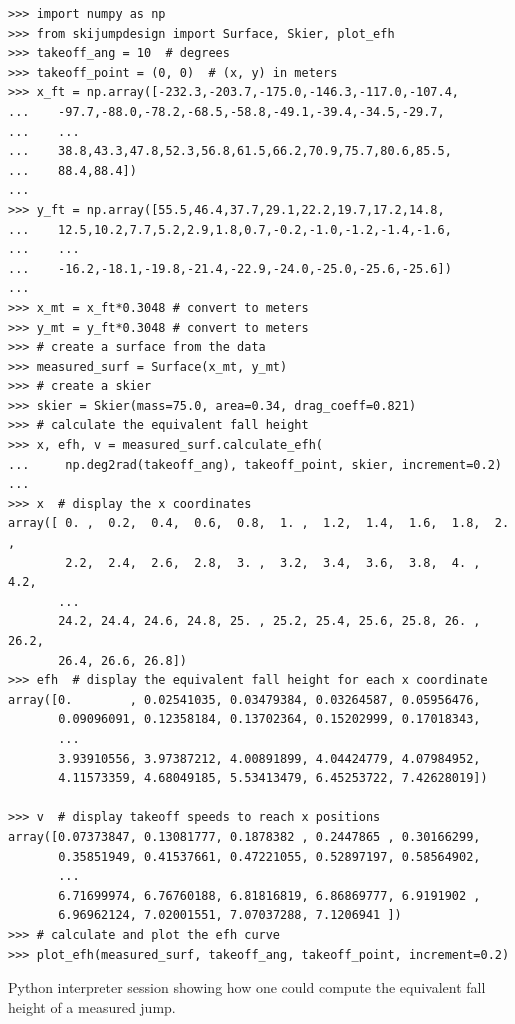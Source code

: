 \documentclass[smallextended]{svjour3}       %
\begin{document}
\begin{listing*}
  \begin{verbatim}
>>> import numpy as np
>>> from skijumpdesign import Surface, Skier, plot_efh
>>> takeoff_ang = 10  # degrees
>>> takeoff_point = (0, 0)  # (x, y) in meters
>>> x_ft = np.array([-232.3,-203.7,-175.0,-146.3,-117.0,-107.4,
...    -97.7,-88.0,-78.2,-68.5,-58.8,-49.1,-39.4,-34.5,-29.7,
...    ...
...    38.8,43.3,47.8,52.3,56.8,61.5,66.2,70.9,75.7,80.6,85.5,
...    88.4,88.4])
...
>>> y_ft = np.array([55.5,46.4,37.7,29.1,22.2,19.7,17.2,14.8,
...    12.5,10.2,7.7,5.2,2.9,1.8,0.7,-0.2,-1.0,-1.2,-1.4,-1.6,
...    ...
...    -16.2,-18.1,-19.8,-21.4,-22.9,-24.0,-25.0,-25.6,-25.6])
...
>>> x_mt = x_ft*0.3048 # convert to meters
>>> y_mt = y_ft*0.3048 # convert to meters
>>> # create a surface from the data
>>> measured_surf = Surface(x_mt, y_mt)
>>> # create a skier
>>> skier = Skier(mass=75.0, area=0.34, drag_coeff=0.821)
>>> # calculate the equivalent fall height
>>> x, efh, v = measured_surf.calculate_efh(
...     np.deg2rad(takeoff_ang), takeoff_point, skier, increment=0.2)
...
>>> x  # display the x coordinates
array([ 0. ,  0.2,  0.4,  0.6,  0.8,  1. ,  1.2,  1.4,  1.6,  1.8,  2. ,
        2.2,  2.4,  2.6,  2.8,  3. ,  3.2,  3.4,  3.6,  3.8,  4. ,  4.2,
       ...
       24.2, 24.4, 24.6, 24.8, 25. , 25.2, 25.4, 25.6, 25.8, 26. , 26.2,
       26.4, 26.6, 26.8])
>>> efh  # display the equivalent fall height for each x coordinate
array([0.        , 0.02541035, 0.03479384, 0.03264587, 0.05956476,
       0.09096091, 0.12358184, 0.13702364, 0.15202999, 0.17018343,
       ...
       3.93910556, 3.97387212, 4.00891899, 4.04424779, 4.07984952,
       4.11573359, 4.68049185, 5.53413479, 6.45253722, 7.42628019])

>>> v  # display takeoff speeds to reach x positions
array([0.07373847, 0.13081777, 0.1878382 , 0.2447865 , 0.30166299,
       0.35851949, 0.41537661, 0.47221055, 0.52897197, 0.58564902,
       ...
       6.71699974, 6.76760188, 6.81816819, 6.86869777, 6.9191902 ,
       6.96962124, 7.02001551, 7.07037288, 7.1206941 ])
>>> # calculate and plot the efh curve
>>> plot_efh(measured_surf, takeoff_ang, takeoff_point, increment=0.2)
  \end{verbatim}
  \caption{Python interpreter session showing how one could compute the
  equivalent fall height of a measured jump.}
  \label{lis:example-efh-calc}
\end{listing*}
\end{document}
